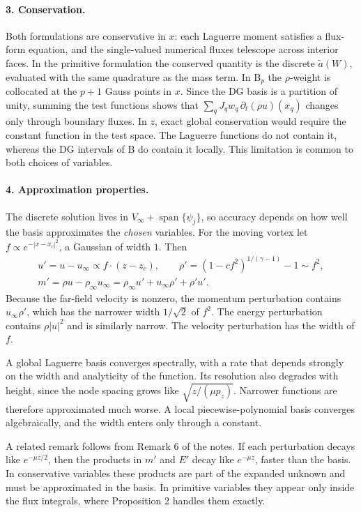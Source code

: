 \documentclass[11pt,a4paper]{article}
\begin{document}
\paragraph{3. Conservation.}
Both formulations are conservative in $x$: each Laguerre moment satisfies a
flux-form equation, and the single-valued numerical fluxes telescope across
interior faces. In the primitive formulation the conserved quantity is the discrete
$\tilde a(W)$, evaluated with the same quadrature as the mass term. In B$_p$ the
$\rho$-weight is collocated at the $p+1$ Gauss points in $x$. Since the DG basis is a
partition of unity, summing the test functions shows that
$\sum_q J_q w_q\,\partial_t(\rho u)(x_q)$ changes only through boundary fluxes. In
$z$, exact global conservation would require the constant function in the test
space. The Laguerre functions do not contain it, whereas the DG intervals of B do
contain it locally. This limitation is common to both choices of variables.

\paragraph{4. Approximation properties.}
The discrete solution lives in $V_\infty+\operatorname{span}\{\psi_j\}$, so accuracy
depends on how well the basis approximates the \emph{chosen} variables. For the
moving vortex let $f\propto e^{-|x-x_c|^2}$, a Gaussian of width $1$. Then
\begin{gather*}
u'=u-u_\infty\propto f\cdot(z-z_c),\qquad
\rho'=(1-c f^2)^{1/(\gamma-1)}-1\sim f^2,\\
m'=\rho u-\rho_\infty u_\infty=\rho_\infty u'+u_\infty\rho'+\rho'u'.
\end{gather*}
Because the far-field velocity is nonzero, the momentum perturbation contains
$u_\infty\rho'$, which has the narrower width $1/\sqrt2$ of $f^2$. The energy
perturbation contains $\rho|u|^2$ and is similarly narrow. The velocity perturbation
has the width of $f$.

A global Laguerre basis converges spectrally, with a rate that depends strongly on
the width and analyticity of the function. Its resolution also degrades with height,
since the node spacing grows like $\sqrt{z/(\mu p_z)}$. Narrower functions are
therefore approximated much worse. A local piecewise-polynomial basis converges
algebraically, and the width enters only through a constant.

A related remark follows from Remark 6 of the notes. If each perturbation decays
like $e^{-\mu z/2}$, then the products in $m'$ and $E'$ decay like $e^{-\mu z}$,
faster than the basis. In conservative variables these products are part of the
expanded unknown and must be approximated in the basis. In primitive variables they
appear only inside the flux integrals, where Proposition 2 handles them exactly.
\end{document}
